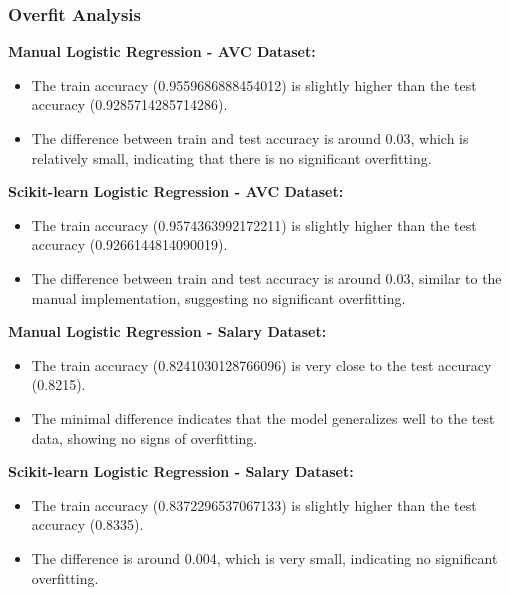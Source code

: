 \documentclass[a4paper,12pt]{article}
\begin{document}
\subsubsection{Overfit Analysis}

\textbf{Manual Logistic Regression - AVC Dataset:}
\begin{itemize}
    \item The train accuracy (0.9559686888454012) is slightly higher than the test accuracy (0.9285714285714286).
    \item The difference between train and test accuracy is around 0.03, which is relatively small, indicating that there is no significant overfitting.
\end{itemize}

\newpage
\textbf{Scikit-learn Logistic Regression - AVC Dataset:}
\begin{itemize}
    \item The train accuracy (0.9574363992172211) is slightly higher than the test accuracy (0.9266144814090019).
    \item The difference between train and test accuracy is around 0.03, similar to the manual implementation, suggesting no significant overfitting.
\end{itemize}

\textbf{Manual Logistic Regression - Salary Dataset:}
\begin{itemize}
    \item The train accuracy (0.8241030128766096) is very close to the test accuracy (0.8215).
    \item The minimal difference indicates that the model generalizes well to the test data, showing no signs of overfitting.
\end{itemize}

\textbf{Scikit-learn Logistic Regression - Salary Dataset:}
\begin{itemize}
    \item The train accuracy (0.8372296537067133) is slightly higher than the test accuracy (0.8335).
    \item The difference is around 0.004, which is very small, indicating no significant overfitting.
\end{itemize}
\end{document}
